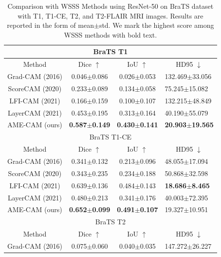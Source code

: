\begin{table}
\centering
\caption{Comparison with WSSS Methods using ResNet-50 on BraTS dataset with T1, T1-CE, T2, and T2-FLAIR MRI images. Results are reported in the form of mean$\pm$std. We mark the highest score among WSSS methods with bold text.}
\label{Table:Supple_Res50}
\begin{tabular}{c|c|c|l}
\hline
\multicolumn{4}{c}{BraTS T1} \\ \hline
Method          & Dice $\uparrow$ & IoU $\uparrow$ & \multicolumn{1}{c}{HD95 $\downarrow$} \\ \hline
Grad-CAM (2016) & 0.046$\pm$0.086    & 0.026$\pm$0.053   & 132.469$\pm$33.056                       \\
ScoreCAM (2020) & 0.233$\pm$0.089    & 0.134$\pm$0.058   & 75.245$\pm$15.082                        \\
LFI-CAM (2021)  & 0.166$\pm$0.159    & 0.100$\pm$0.107   & 132.215$\pm$48.849                       \\
LayerCAM (2021) & 0.453$\pm$0.195    & 0.313$\pm$0.164   & 40.190$\pm$55.079                        \\
AME-CAM  (ours) & \textbf{0.587$\pm$0.149}    & \textbf{0.430$\pm$0.141}   & \textbf{20.903$\pm$19.565 }                       \\ \hline
\multicolumn{4}{c}{BraTS T1-CE} \\ \hline
Method          & Dice $\uparrow$ & IoU $\uparrow$ & \multicolumn{1}{c}{HD95 $\downarrow$} \\ \hline
Grad-CAM (2016) & 0.341$\pm$0.132    & 0.213$\pm$0.096   & 48.055$\pm$17.094                        \\
ScoreCAM (2020) & 0.343$\pm$0.235    & 0.234$\pm$0.188   & 50.868$\pm$32.598                        \\
LFI-CAM (2021)  & 0.639$\pm$0.136    & 0.484$\pm$0.143   & \textbf{18.686$\pm$8.465}                         \\
LayerCAM (2021) & 0.480$\pm$0.213    & 0.341$\pm$0.176   & 40.003$\pm$72.395                        \\
AME-CAM  (ours) & \textbf{0.652$\pm$0.099}    & \textbf{0.491$\pm$0.107}   & 19.327$\pm$10.951                        \\ \hline
\multicolumn{4}{c}{BraTS T2} \\ \hline
Method          & Dice $\uparrow$ & IoU $\uparrow$ & \multicolumn{1}{c}{HD95 $\downarrow$} \\ \hline
Grad-CAM (2016) & 0.075$\pm$0.060    & 0.040$\pm$0.035   & 147.272$\pm$26.227                       \\

\end{tabular}
\end{table}
